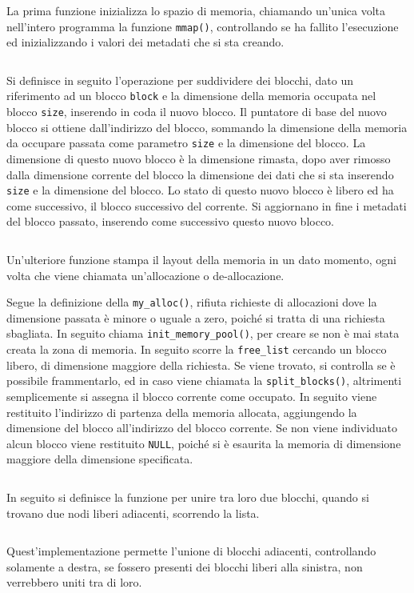 \documentclass{article}
\numberwithin{equation}{subsection}
\begin{document}
La prima funzione inizializza lo spazio di memoria, chiamando un'unica volta nell'intero programma la funzione \verb|mmap()|, controllando se ha fallito l'esecuzione ed inizializzando 
i valori dei metadati che si sta creando. 
\inputminted[firstline=30,lastline=44]{c}{./"Esercitazione del 19-11-24"/domanda4.c}

Si definisce in seguito l'operazione per suddividere dei blocchi, dato un riferimento ad un blocco \verb|block| e la dimensione della memoria occupata nel blocco \verb|size|, inserendo in coda il nuovo blocco.  
Il puntatore di base del nuovo blocco si ottiene dall'indirizzo del blocco, sommando la dimensione della memoria da occupare passata come parametro \verb|size| e la dimensione del blocco. La dimensione di questo nuovo blocco è la dimensione rimasta, dopo aver rimosso dalla dimensione corrente del blocco la dimensione dei dati che si sta inserendo \verb|size| e la dimensione del blocco. Lo stato di questo nuovo blocco è libero ed ha come successivo, il blocco 
successivo del corrente. Si aggiornano in fine i metadati del blocco passato, inserendo come successivo questo nuovo blocco. 
\inputminted[firstline=47,lastline=56]{c}{./"Esercitazione del 19-11-24"/domanda4.c}


Un'ulteriore funzione stampa il layout della memoria in un dato momento, ogni volta che viene 
chiamata un'allocazione o de-allocazione. 

Segue la definizione della \verb|my_alloc()|, rifiuta richieste di allocazioni dove la dimensione passata è minore o uguale a zero, poiché si tratta di una richiesta sbagliata. In seguito chiama \verb|init_memory_pool()|, per creare se non è mai stata creata la zona di memoria. 
In seguito scorre la \verb|free_list| cercando un blocco libero, di dimensione maggiore della richiesta. Se viene trovato, si controlla se è possibile frammentarlo, ed in caso viene chiamata la \verb|split_blocks()|, altrimenti semplicemente si assegna il blocco corrente come occupato. 
In seguito viene restituito l'indirizzo di partenza della memoria allocata, aggiungendo la dimensione del blocco all'indirizzo del blocco corrente. 
Se non viene individuato alcun blocco viene restituito \verb|NULL|, poiché si è esaurita la memoria di dimensione maggiore della dimensione specificata. 
\inputminted[firstline=70,lastline=89]{c}{./"Esercitazione del 19-11-24"/domanda4.c}

In seguito si definisce la funzione per unire tra loro due blocchi, quando si trovano due nodi 
liberi adiacenti, scorrendo la lista. 
\inputminted[firstline=91,lastline=96]{c}{./"Esercitazione del 19-11-24"/domanda4.c}
Quest'implementazione permette l'unione di blocchi adiacenti, controllando solamente a destra, se fossero presenti dei blocchi liberi alla sinistra, non verrebbero uniti tra di loro. 
\end{document}
